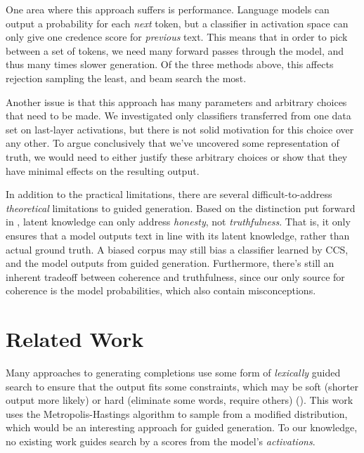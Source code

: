 \documentclass{article}
\begin{document}
One area where this approach suffers is performance. Language models can output a probability for each {\em next} token, but a classifier in activation space can only give one credence score for {\em previous} text. This means that in order to pick between a set of tokens, we need many forward passes through the model, and thus many times slower generation. Of the three methods above, this affects rejection sampling the least, and beam search the most. 

Another issue is that this approach has many parameters and arbitrary choices that need to be made. We investigated only classifiers transferred from one data set on last-layer activations, but there is not solid motivation for this choice over any other. To argue conclusively that we've uncovered some representation of truth, we would need to either justify these arbitrary choices or show that they have minimal effects on the resulting output.
 
In addition to the practical limitations, there are several difficult-to-address {\em theoretical} limitations to guided generation. Based on the distinction put forward in \cite{evans2021truthful}, latent knowledge can only address {\em honesty}, not {\em truthfulness}. That is, it only ensures that a model outputs text in line with its latent knowledge, rather than actual ground truth. A biased corpus may still bias a classifier learned by CCS, and the model outputs from guided generation. Furthermore, there's still an inherent tradeoff between coherence and truthfulness, since our only source for coherence is the model probabilities, which also contain misconceptions. 
   
 
 \section{Related Work}
 
Many approaches to generating completions use some form of {\em lexically} guided search to ensure that the output fits some constraints, which may be soft (shorter output more likely) or hard (eliminate some words, require others) (\cite{miao2018cgmh}). This work uses the Metropolis-Hastings algorithm to sample from a modified distribution, which would be an interesting approach for guided generation. To our knowledge, no existing work guides search by a scores from the model's {\em activations}. 
\end{document}
